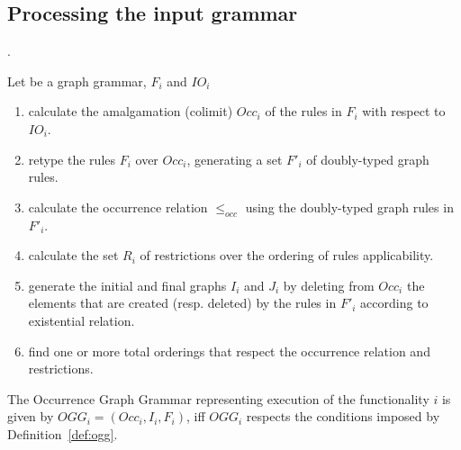 \subsection{Processing the input grammar}


.

\begin{definition}\label{def:ogg-construction} Let \graphGrammar{} be a graph grammar, $F_i$ and $IO_i$

\begin{enumerate}
\item calculate the amalgamation (colimit) $Occ_i$ of the rules in $F_i$ with respect to $IO_i$.

\hfill\break

\item retype the rules $F_i$ over $Occ_i$, generating a set $F'_i$ of doubly-typed graph rules.

\item calculate the occurrence relation $\leq_{occ}$ using the doubly-typed graph rules in $F'_i$.
\item calculate the set $R_i$ of restrictions over the ordering of rules applicability.
\item generate the initial and final graphs $I_i$ and $J_i$ by deleting from $Occ_i$ the elements that are created (resp. deleted) by the rules in $F'_i$ according to existential relation.
\item find one or more total orderings that respect the occurrence relation and restrictions.
\end{enumerate}

  The Occurrence Graph Grammar representing execution of the functionality $i$ is given by $OGG_i = (Occ_i, I_i,F_i)$, iff $OGG_i$ respects the conditions imposed by Definition~\ref{def:ogg}.
\end{definition}


